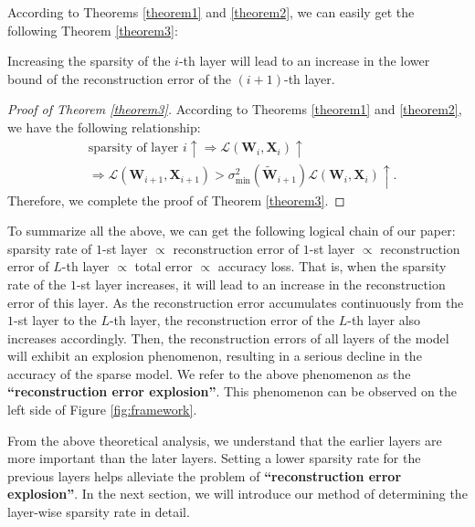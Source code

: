 According to Theorems \ref{theorem1} and \ref{theorem2}, we can easily get the following Theorem \ref{theorem3}:
\begin{theorem}\label{theorem3}
Increasing the sparsity of the \(i\)-th layer will lead to an increase in the lower bound of the reconstruction error of the \((i+1)\)-th layer.
\end{theorem}
\begin{proof}[Proof of Theorem \ref{theorem3}]
According to Theorems \ref{theorem1} and \ref{theorem2}, we have the following relationship:
\begin{equation}
\begin{aligned}
&\text{sparsity of layer } i \uparrow \Longrightarrow \mathcal{L}(\boldsymbol{W}_i, \boldsymbol{X}_i) \uparrow \\
&\Longrightarrow \mathcal{L}(\boldsymbol{W}_{i+1}, \boldsymbol{X}_{i+1}) > \sigma_{\min}^2(\widetilde{\boldsymbol{W}}_{i+1}) \mathcal{L}(\boldsymbol{W}_i, \boldsymbol{X}_i) \uparrow.
\end{aligned}
\end{equation}
Therefore, we complete the proof of Theorem \ref{theorem3}.
\end{proof}

To summarize all the above, we can get the following logical chain of our paper: sparsity rate of \(1\)-st layer \(\propto\) reconstruction error of \(1\)-st layer \(\propto\) reconstruction error of \(L\)-th layer \(\propto\) total error \(\propto\) accuracy loss. That is, when the sparsity rate of the \(1\)-st layer increases, it will lead to an increase in the reconstruction error of this layer. As the reconstruction error accumulates continuously from the \(1\)-st layer to the \(L\)-th layer, the reconstruction error of the \(L\)-th layer also increases accordingly. Then, the reconstruction errors of all layers of the model will exhibit an explosion phenomenon, resulting in a serious decline in the accuracy of the sparse model. We refer to the above phenomenon as the \textbf{``reconstruction error explosion''}. This phenomenon can be observed on the left side of Figure \ref{fig:framework}.

From the above theoretical analysis, we understand that the earlier layers are more important than the later layers. Setting a lower sparsity rate for the previous layers helps alleviate the problem of \textbf{``reconstruction error explosion''}. In the next section, we will introduce our method of determining the layer-wise sparsity rate in detail.

